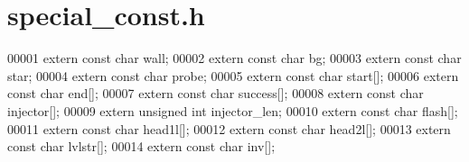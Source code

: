 \hypertarget{special__const_8h_source}{}\section{special\+\_\+const.\+h}
\label{special__const_8h_source}

\begin{DoxyCode}
00001 \textcolor{keyword}{extern} \textcolor{keyword}{const} \textcolor{keywordtype}{char}   wall;
00002 \textcolor{keyword}{extern} \textcolor{keyword}{const} \textcolor{keywordtype}{char}   bg;
00003 \textcolor{keyword}{extern} \textcolor{keyword}{const} \textcolor{keywordtype}{char}   star;
00004 \textcolor{keyword}{extern} \textcolor{keyword}{const} \textcolor{keywordtype}{char}   probe;
00005 \textcolor{keyword}{extern} \textcolor{keyword}{const} \textcolor{keywordtype}{char}   start[];
00006 \textcolor{keyword}{extern} \textcolor{keyword}{const} \textcolor{keywordtype}{char}   end[];
00007 \textcolor{keyword}{extern} \textcolor{keyword}{const} \textcolor{keywordtype}{char}   success[];
00008 \textcolor{keyword}{extern} \textcolor{keyword}{const} \textcolor{keywordtype}{char}   injector[];
00009 \textcolor{keyword}{extern} \textcolor{keywordtype}{unsigned} \textcolor{keywordtype}{int} injector\_len;
00010 \textcolor{keyword}{extern} \textcolor{keyword}{const} \textcolor{keywordtype}{char}   flash[];
00011 \textcolor{keyword}{extern} \textcolor{keyword}{const} \textcolor{keywordtype}{char}   head1l[];
00012 \textcolor{keyword}{extern} \textcolor{keyword}{const} \textcolor{keywordtype}{char}   head2l[];
00013 \textcolor{keyword}{extern} \textcolor{keyword}{const} \textcolor{keywordtype}{char}   lvlstr[];
00014 \textcolor{keyword}{extern} \textcolor{keyword}{const} \textcolor{keywordtype}{char}   inv[];
\end{DoxyCode}
